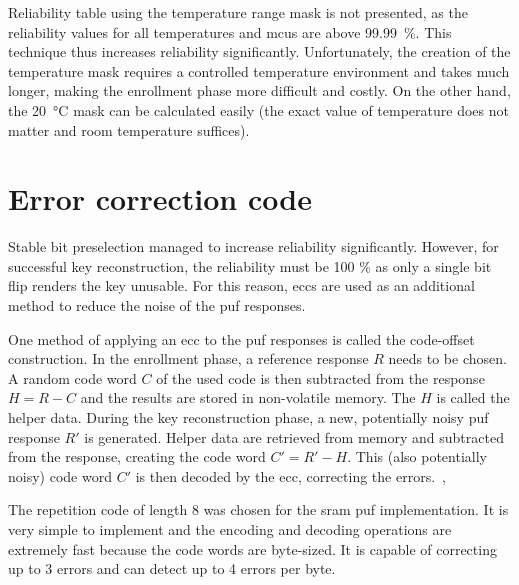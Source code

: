 Reliability table using the temperature range mask is not presented, as the reliability values for all temperatures and \glspl{mcu} are above 99.99~\%. This technique thus increases reliability significantly. Unfortunately, the creation of the temperature mask requires a controlled temperature environment and takes much longer, making the enrollment phase more difficult and costly. On the other hand, the 20~°C mask can be calculated easily (the exact value of temperature does not matter and room temperature suffices).


\section{Error correction code}\label{sec:ecc}

Stable bit preselection managed to increase reliability significantly. However, for successful key reconstruction, the reliability must be 100 \% as only a single bit flip renders the key unusable. For this reason, \glspl{ecc} are used as an additional method to reduce the noise of the \gls{puf} responses.

One method of applying an \gls{ecc} to the \gls{puf} responses is called the code-offset construction. In the enrollment phase, a reference response $R$ needs to be chosen. A random code word $C$ of the used code is then subtracted from the response $H = R - C$ and the results are stored in non-volatile memory. The $H$ is called the helper data. During the key reconstruction phase, a new, potentially noisy \gls{puf} response $R'$ is generated. Helper data are retrieved from memory and subtracted from the response, creating the code word $C' = R' - H$. This (also potentially noisy) code word $C'$ is then decoded by the \gls{ecc}, correcting the errors.~\cite{Sven2015},~\cite{Dodis2008}

The repetition code of length 8 was chosen for the \gls{sram} \gls{puf} implementation. It is very simple to implement and the encoding and decoding operations are extremely fast because the code words are byte-sized. It is capable of correcting up to 3 errors and can detect up to 4 errors per byte.

